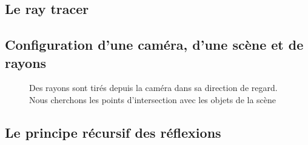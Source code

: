 \documentclass[11pt]{article}
\begin{document}
\newpage%
\begin{appendices}
	\section{Le ray tracer}
		\subsection{Configuration d'une caméra, d'une scène et de rayons}
		\begin{figure}[h!]
		
			\caption{Des rayons sont tirés depuis la caméra dans sa direction de regard. Nous cherchons les points d'intersection avec les objets de la scène}
		\end{figure}
		\FloatBarrier
		\label{annexe:repreCamRayon}

		\subsection{Le principe récursif des réflexions}
		\begin{figure}[!h]
		

\end{figure}
\end{appendices}
\end{document}
